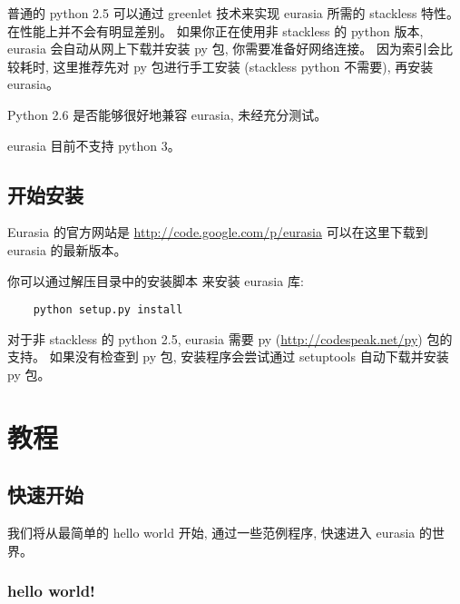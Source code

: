 \documentclass{manual}
\begin{document}

普通的 python 2.5 可以通过 greenlet 技术来实现 eurasia 所需的 stackless 特性。在性能上并不会有明显差别。
如果你正在使用非 stackless 的 python 版本, eurasia 会自动从网上下载并安装 py 包, 你需要准备好网络连接。
因为索引会比较耗时, 这里推荐先对 py 包进行手工安装 (stackless python 不需要), 再安装 eurasia。


Python 2.6 是否能够很好地兼容 eurasia, 未经充分测试。


eurasia 目前不支持 python 3。

\section{开始安装}

Eurasia 的官方网站是 \url{http://code.google.com/p/eurasia}
可以在这里下载到 eurasia 的最新版本。

你可以通过解压目录中的安装脚本  来安装 eurasia 库:

\begin{verbatim}
    python setup.py install
\end{verbatim}

对于非 stackless 的 python 2.5, eurasia 需要 py (\url{http://codespeak.net/py}) 包的支持。
如果没有检查到 py 包, 安装程序会尝试通过 setuptools 自动下载并安装 py 包。



\chapter{教程}

\section{快速开始}

我们将从最简单的 hello world 开始, 通过一些范例程序, 快速进入 eurasia 的世界。

\subsection{hello world!}
\end{document}
